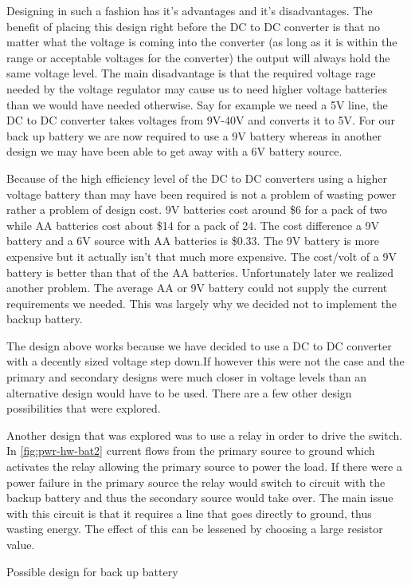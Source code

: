 Designing in such a fashion has it{}'s advantages and it{}'s disadvantages. The
benefit of placing this design right before the DC to DC converter is that no
matter what the voltage is coming into the converter (as long as it is within
the range or acceptable voltages for the converter) the output will always hold
the same voltage level. The main disadvantage is that the required voltage rage
needed by the voltage regulator may cause us to need higher voltage batteries
than we would have needed otherwise. Say for example we need a 5V line, the DC
to DC converter takes voltages from 9V{}-40V and converts it to 5V. For our
back up battery we are now required to use a 9V battery whereas in another
design we may have been able to get away with a 6V battery source.

Because of the high efficiency level of the DC to DC converters using a higher
voltage battery than may have been required is not a problem of wasting power
rather a problem of design cost. 9V batteries cost around \$6 for a pack of two
while AA batteries cost about \$14 for a pack of 24. The cost difference a 9V
battery and a 6V source with AA batteries is \$0.33. The 9V battery is more
expensive but it actually isn{}'t that much more expensive. The cost/volt of a
9V battery is better than that of the AA batteries. Unfortunately later we realized another problem. The average AA or 9V battery could not supply the current requirements we needed. This was largely why we decided not to implement the backup battery. 

The design above works because we have decided to use a DC to DC converter with
a decently sized voltage step down.If however this were not the case and the
primary and secondary designs were much closer in voltage levels than an
alternative design would have to be used. There are a few other design
possibilities that were explored.

Another design that was explored was to use a relay in order to drive the
switch. In \autoref{fig:pwr-hw-bat2} current flows from the primary source to
ground which activates the relay allowing the primary source to power the load.
If there were a power failure in the primary source the relay would switch to
circuit with the backup battery and thus the secondary source would take over.
The main issue with this circuit is that it requires a line that goes directly
to ground, thus wasting energy. The effect of this can be lessened by choosing
a large resistor value. 

{Possible design for back up battery\protect\cite{link16}}

